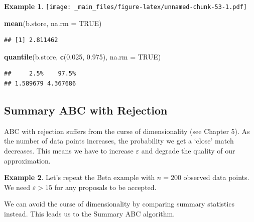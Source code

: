 \documentclass[
]{book}
\newenvironment{Shaded}{\begin{snugshade}}{\end{snugshade}}
\newcommand{\AttributeTok}[1]{\textcolor[rgb]{0.13,0.29,0.53}{#1}}
\newcommand{\ConstantTok}[1]{\textcolor[rgb]{0.56,0.35,0.01}{#1}}
\newcommand{\FloatTok}[1]{\textcolor[rgb]{0.00,0.00,0.81}{#1}}
\newcommand{\FunctionTok}[1]{\textcolor[rgb]{0.13,0.29,0.53}{\textbf{#1}}}
\newcommand{\NormalTok}[1]{#1}
\theoremstyle{definition}
\theoremstyle{definition}
\newtheorem{example}{Example}[chapter]
\theoremstyle{definition}
\theoremstyle{definition}
\theoremstyle{remark}
\begin{document}
\begin{example}
\texttt{[image: \_main\_files/figure-latex/unnamed-chunk-53-1.pdf]}

\begin{Shaded}
\begin{Highlighting}[]
\FunctionTok{mean}\NormalTok{(b.store, }\AttributeTok{na.rm =} \ConstantTok{TRUE}\NormalTok{)}
\end{Highlighting}
\end{Shaded}

\begin{verbatim}
## [1] 2.811462
\end{verbatim}

\begin{Shaded}
\begin{Highlighting}[]
\FunctionTok{quantile}\NormalTok{(b.store, }\FunctionTok{c}\NormalTok{(}\FloatTok{0.025}\NormalTok{, }\FloatTok{0.975}\NormalTok{), }\AttributeTok{na.rm =} \ConstantTok{TRUE}\NormalTok{)}
\end{Highlighting}
\end{Shaded}

\begin{verbatim}
##     2.5%    97.5% 
## 1.589679 4.367686
\end{verbatim}

\end{example}

\hypertarget{summary-abc-with-rejection}{%
\subsection{Summary ABC with Rejection}\label{summary-abc-with-rejection}}

ABC with rejection suffers from the curse of dimensionality (see Chapter 5). As the number of data points increases, the probability we get a `close' match decreases. This means we have to increase \(\varepsilon\) and degrade the quality of our approximation.

\begin{example}
Let's repeat the Beta example with \(n = 200\) observed data points. We need \(\varepsilon > 15\) for any proposals to be accepted.
\end{example}

We can avoid the curse of dimensionality by comparing summary statistics instead. This leads us to the Summary ABC algorithm.
\end{document}
